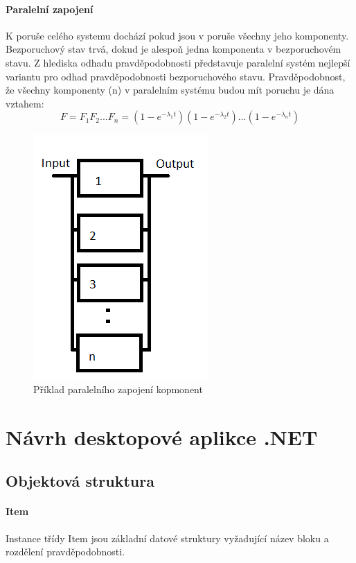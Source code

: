 \documentclass[FM,RP]{tulthesis}
\begin{document}
        \subsubsection*{Paralelní zapojení}
            K poruše celého systemu dochází pokud jsou v poruše všechny jeho komponenty. Bezporuchový stav trvá, dokud je alespoň jedna komponenta v bezporuchovém stavu.
            Z hlediska odhadu pravděpodobnosti představuje paralelní systém nejlepší variantu pro odhad pravděpodobnosti bezporuchového stavu.
            Pravděpodobnost, že všechny komponenty (n) v paralelním systému budou mít poruchu je dána vztahem:
            $$ F = F_{1}F_{2}...F_{n} = (1-e^{-\lambda_{1}t})(1-e^{-\lambda_{2}t})...(1-e^{-\lambda_{n}t}) $$
            \begin{figure}[h]
                \centering
                \includegraphics[scale=0.75]{pic/paralelni.png}
                \caption{Příklad paralelního zapojení kopmonent} \label{Obrázek č. 2.1}
            \end{figure}

\chapter{Návrh desktopové aplikce .NET}
    \section{Objektová struktura}
        \subsubsection{Item}
            Instance třídy Item jsou základní datové struktury vyžadující název bloku a rozdělení pravděpodobnosti.
\end{document}
